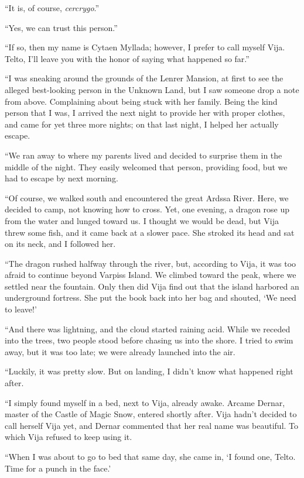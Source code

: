 ``It is, of course, \emph{cercrygo}.''

``Yes, we can trust this person.''

``If so, then my name is Cytaen Myllada; however, I prefer to call myself Vija. Telto, I'll leave you with the honor of saying what happened so far.''

``I was sneaking around the grounds of the Lenrer Mansion, at first to see the alleged best-looking person in the Unknown Land, but I saw someone drop a note from above. Complaining about being stuck with her family. Being the kind person that I was, I arrived the next night to provide her with proper clothes, and came for yet three more nights; on that last night, I helped her actually escape.

``We ran away to where my parents lived and decided to surprise them in the middle of the night. They easily welcomed that person, providing food, but we had to escape by next morning.

``Of course, we walked south and encountered the great Ardssa River. Here, we decided to camp, not knowing how to cross. Yet, one evening, a dragon rose up from the water and lunged toward us. I thought we would be dead, but Vija threw some fish, and it came back at a slower pace. She stroked its head and sat on its neck, and I followed her.

``The dragon rushed halfway through the river, but, according to Vija, it was too afraid to continue beyond Varpiss Island. We climbed toward the peak, where we settled near the fountain. Only then did Vija find out that the island harbored an underground fortress. She put the book back into her bag and shouted, `We need to leave!'

``And there was lightning, and the cloud started raining acid. While we receded into the trees, two people stood before chasing us into the shore. I tried to swim away, but it was too late; we were already launched into the air.

``Luckily, it was pretty slow. But on landing, I didn't know what happened right after.

``I simply found myself in a bed, next to Vija, already awake. Arcame Dernar, master of the Castle of Magic Snow, entered shortly after. Vija hadn't decided to call herself Vija yet, and Dernar commented that her real name was beautiful. To which Vija refused to keep using it.

``When I was about to go to bed that same day, she came in, `I found one, Telto. Time for a punch in the face.'

